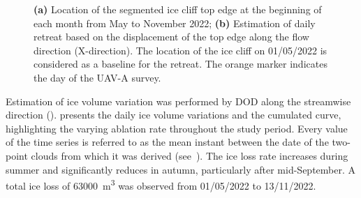 \begin{figure}
  \centering
  \caption{\textbf{(a)} Location of the segmented ice cliff top edge at the beginning of each month from May to November 2022; \textbf{(b)} Estimation of daily retreat based on the displacement of the top edge along the flow direction (X-direction). The location of the ice cliff on 01/05/2022 is considered as a baseline for the retreat. The orange marker indicates the day of the UAV-A survey.}
  \label{fig:4:retreat}
\end{figure}

Estimation of ice volume variation was performed by DOD along the streamwise direction ().
 presents the daily ice volume variations and the cumulated curve, highlighting the varying ablation rate throughout the study period.
Every value of the time series is referred to as the mean instant between the date of the two-point clouds from which it was derived (see~).
The ice loss rate increases during summer and significantly reduces in autumn, particularly after mid-September.
A total ice loss of \SI{63000}{\cubic\meter} was observed from 01/05/2022 to 13/11/2022.

